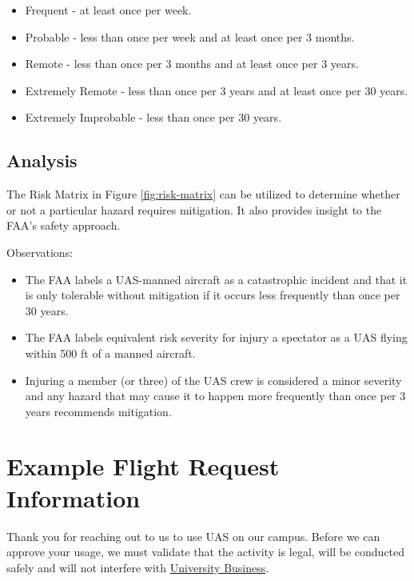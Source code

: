 \documentclass[
]{book}
\providecommand{\tightlist}{%
  \setlength{\itemsep}{0pt}\setlength{\parskip}{0pt}}
\begin{document}
\begin{itemize}
\tightlist
\item
  Frequent - at least once per week.
\item
  Probable - less than once per week and at least once per 3 months.
\item
  Remote - less than once per 3 months and at least once per 3 years.
\item
  Extremely Remote - less than once per 3 years and at least once per 30 years.
\item
  Extremely Improbable - less than once per 30 years.
\end{itemize}

\hypertarget{analysis}{%
\section{Analysis}\label{analysis}}

The Risk Matrix in Figure \ref{fig:risk-matrix} can be utilized to determine whether or not a particular hazard requires mitigation. It also provides insight to the FAA's safety approach.

Observations:

\begin{itemize}
\tightlist
\item
  The FAA labels a UAS-manned aircraft as a catastrophic incident and that it is only tolerable without mitigation if it occurs less frequently than once per 30 years.\\
\item
  The FAA labels equivalent risk severity for injury a spectator as a UAS flying within 500 ft of a manned aircraft.
\item
  Injuring a member (or three) of the UAS crew is considered a minor severity and any hazard that may cause it to happen more frequently than once per 3 years recommends mitigation.
\end{itemize}

\hypertarget{ch-request}{%
\chapter{Example Flight Request Information}\label{ch-request}}

Thank you for reaching out to us to use UAS on our campus. Before we can approve your usage, we must validate that the activity is legal, will be conducted safely and will not interfere with \protect\hyperlink{UB}{University Business}.
\end{document}
